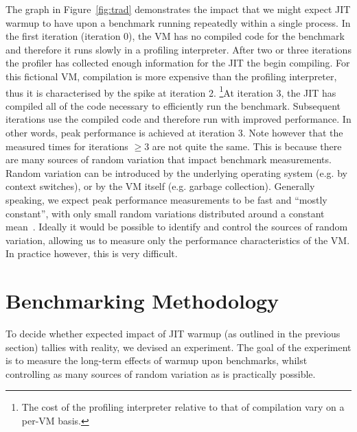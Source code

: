 \documentclass[10pt,preprint]{sigplanconf}
\begin{document}
The graph in Figure~\ref{fig:trad} demonstrates the impact that we might
expect JIT warmup to have upon a benchmark running repeatedly within a
single process. In the first iteration (iteration 0), the VM has no compiled
code for the benchmark and therefore it runs slowly in a profiling
interpreter. After two or three iterations the profiler has collected enough
information for the JIT the begin compiling. For this fictional VM,
compilation is more expensive than the profiling interpreter, thus it is
characterised by the spike at iteration 2. \footnote{The cost of
the profiling interpreter relative to that of compilation vary on a per-VM
basis.}At iteration 3, the JIT has compiled all of the code necessary to
efficiently run the benchmark. Subsequent iterations use the compiled code
and therefore run with improved performance. In other words, peak
performance is achieved at iteration 3. Note however that the measured times
for iterations $\geq 3$ are not quite the same. This is because there are many
sources of random variation that impact benchmark measurements. Random
variation can be introduced by the underlying operating system (e.g. by
context switches), or by the VM itself (e.g. garbage collection).  Generally
speaking, we expect peak performance measurements to be fast and ``mostly
constant'', with only small random variations distributed around a constant
mean~\cite{XXX}.  Ideally it would be possible to identify and control the
sources of random variation, allowing us to measure only the performance
characteristics of the VM. In practice however, this is very difficult.


\section{Benchmarking Methodology}
\label{sec:methodology}

To decide whether expected impact of JIT warmup (as outlined in the previous
section) tallies with reality, we devised an experiment.  The goal of the
experiment is to measure the long-term effects of warmup upon benchmarks,
whilst controlling as many sources of random variation as is practically
possible.
\end{document}
